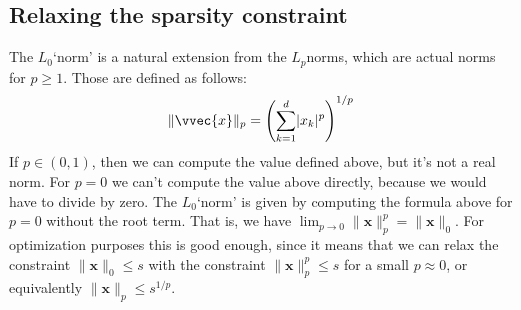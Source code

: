 \documentclass[letterpaper,10pt,english]{jupyterBook}
\begin{document}
\subsection{Relaxing the sparsity constraint}
\label{\detokenize{regression_sparse:relaxing-the-sparsity-constraint}}
\sphinxAtStartPar
The \(L_0\)\sphinxhyphen{}‘norm’ is a natural extension from the \(L_p\)\sphinxhyphen{}norms, which are actual norms for \(p\geq 1\). Those are defined as follows:
\label{equation:regression_sparse:801d3926-b587-414e-944a-7e4e6958916c}\begin{align}
    \lVert \vvec{x}\rVert_p = \left(\sum_{k=1}^d \lvert x_k\rvert^p\right)^{1/p}
\end{align}
\sphinxAtStartPar
If \(p\in (0,1)\), then we can compute the value defined above, but it’s not a real norm. For \(p=0\) we can’t compute the value above directly, because we would have to divide by zero. The \(L_0\)\sphinxhyphen{}‘norm’ is given by computing the formula above for \(p=0\) without the root term. That is, we have \(\lim_{p\rightarrow 0}\lVert\mathbf{x}\rVert_p^p=\lVert \mathbf{x}\rVert_0\). For optimization purposes this is good enough, since it means that we can relax the constraint \(\lVert \mathbf{x}\rVert_0\leq s\) with the constraint \(\lVert \mathbf{x}\rVert_p^p \leq s\) for a small \(p\approx 0\), or equivalently \(\lVert \mathbf{x}\rVert_p \leq s^{1/p}\).
\end{document}

